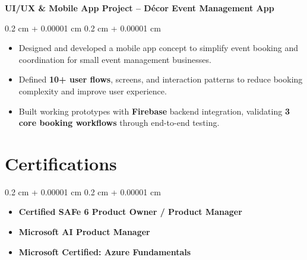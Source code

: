 \documentclass[10pt, letterpaper]{article}
\newenvironment{highlights}{
    \begin{itemize}[
        topsep=0.10 cm,
        parsep=0.10 cm,
        partopsep=0pt,
        itemsep=0pt,
        leftmargin=0.4 cm + 10pt
    ]
}{
    \end{itemize}
} %
\newenvironment{onecolentry}{
    \begin{adjustwidth}{
        0.2 cm + 0.00001 cm
    }{
        0.2 cm + 0.00001 cm
    }
}{
    \end{adjustwidth}
} %
\begin{document}
            \textbf{UI/UX \& Mobile App Project – Décor Event Management App}
        \vspace{0.10 cm}
        \begin{onecolentry}
            \begin{highlights}
                \item Designed and developed a mobile app concept to simplify event booking and coordination for small event management businesses.
                
                \item Defined \textbf{10+ user flows}, screens, and interaction patterns to reduce booking complexity and improve user experience.
                
                \item Built working prototypes with \textbf{Firebase} backend integration, validating \textbf{3 core booking workflows} through end-to-end testing.
            \end{highlights}
        \end{onecolentry}

        \vspace{0.2 cm}

    \section{Certifications}

        \begin{onecolentry}
            \begin{highlights}
                \item \textbf{Certified SAFe 6 Product Owner / Product Manager}
                \item \textbf{Microsoft AI Product Manager}
                \item \textbf{Microsoft Certified: Azure Fundamentals}
            \end{highlights}
        \end{onecolentry}
\end{document}

